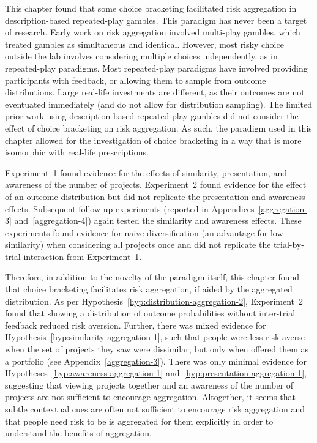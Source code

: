 \documentclass[a4paper, nobind]{templates/ociamthesis}
\theoremstyle{definition}
\theoremstyle{definition}
\theoremstyle{definition}
\theoremstyle{definition}
\theoremstyle{remark}
\begin{document}
This chapter found that some choice bracketing facilitated risk aggregation in
description-based repeated-play gambles. This paradigm has never been a target
of research. Early work on risk aggregation involved multi-play gambles, which
treated gambles as simultaneous and identical. However, most risky choice
outside the lab involves considering multiple choices independently, as in
repeated-play paradigms. Most repeated-play paradigms have involved providing
participants with feedback, or allowing them to sample from outcome
distributions. Large real-life investments are different, as their outcomes are
not eventuated immediately (and do not allow for distribution sampling). The
limited prior work using description-based repeated-play gambles did not
consider the effect of choice bracketing on risk aggregation. As such, the
paradigm used in this chapter allowed for the investigation of choice bracketing
in a way that is more isomorphic with real-life prescriptions.

Experiment~1 found evidence for the effects of similarity, presentation, and
awareness of the number of projects. Experiment~2 found evidence for the effect
of an outcome distribution but did not replicate the presentation and awareness
effects. Subsequent follow up experiments (reported in
Appendices~\ref{aggregation-3} and~\ref{aggregation-4}) again tested the
similarity and awareness effects. These experiments found evidence for naive
diversification (an advantage for low similarity) when considering all projects
once and did not replicate the trial-by-trial interaction from Experiment~1.

Therefore, in addition to the novelty of the paradigm itself, this chapter found
that choice bracketing facilitates risk aggregation, if aided by the aggregated
distribution. As per Hypothesis~\ref{hyp:distribution-aggregation-2},
Experiment~2 found that showing a distribution of outcome probabilities without
inter-trial feedback reduced risk aversion. Further, there was mixed evidence
for Hypothesis~\ref{hyp:similarity-aggregation-1}, such that people were less
risk averse when the set of projects they saw were dissimilar, but only when
offered them as a portfolio (see Appendix~\ref{aggregation-3}). There was only
minimal evidence for Hypotheses~\ref{hyp:awareness-aggregation-1}
and~\ref{hyp:presentation-aggregation-1}, suggesting that viewing projects
together and an awareness of the number of projects are not sufficient to
encourage aggregation. Altogether, it seems that subtle contextual cues are
often not sufficient to encourage risk aggregation and that people need risk to
be is aggregated for them explicitly in order to understand the benefits of
aggregation.
\end{document}
